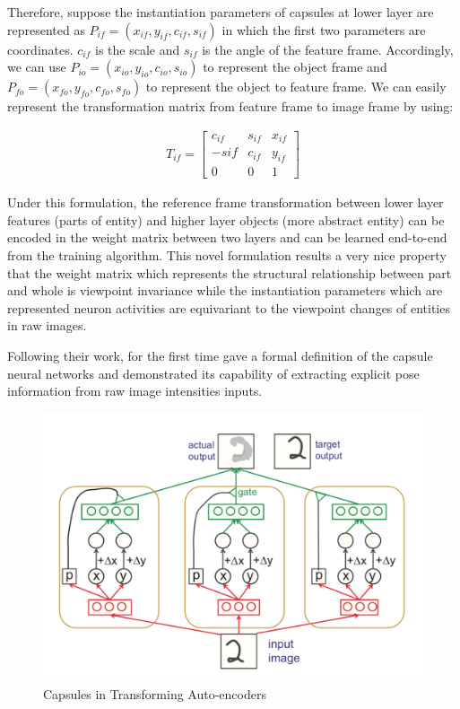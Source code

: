 \documentclass{article} \usepackage{tabularx}
\renewcommand{\citename}{\citet} \renewcommand{\cite}{\citep}
\begin{document}
Therefore, suppose the instantiation parameters of capsules at
lower layer are represented as $P_{if} =
(x_{if},y_{if},c_{if},s_{if})$ in which the first two parameters
are coordinates. $c_{if}$ is the scale and $s_{if}$ is the angle
of the feature frame. Accordingly, we can use $P_{io} =
(x_{io},y_{io},c_{io},s_{io})$ to represent the object frame and
$P_{fo} = (x_{fo},y_{fo},c_{fo},s_{fo})$ to represent the object
to feature frame. We can easily represent the transformation
matrix from feature frame to image frame by using:

\begin{align*}
  T_{if}=
  \begin{bmatrix}
    c_{if} & s_{if} & x_{if} \\
    -s{if} & c_{if} & y_{if} \\
    0 & 0 & 1
  \end{bmatrix}
\end{align*}

Under this formulation, the reference frame transformation
between lower layer features (parts of entity) and higher layer
objects (more abstract entity) can be encoded in the weight
matrix between two layers and can be learned end-to-end from the
training algorithm. This novel formulation results a very nice
property that the weight matrix which represents the structural
relationship between part and whole is viewpoint invariance while
the instantiation parameters which are represented neuron
activities are equivariant to the viewpoint changes of entities
in raw images.

Following their work, \citename{hinton2011transforming} for the
first time gave a formal definition of the capsule neural
networks and demonstrated its capability of extracting explicit
pose information from raw image intensities inputs.

\begin{figure}[H]
  \centering
  \includegraphics[scale=0.5]{images/caps_cord.png}
  \caption{Capsules in Transforming Auto-encoders}
  \label{fig:caps-cord}
\end{figure}
\end{document}
